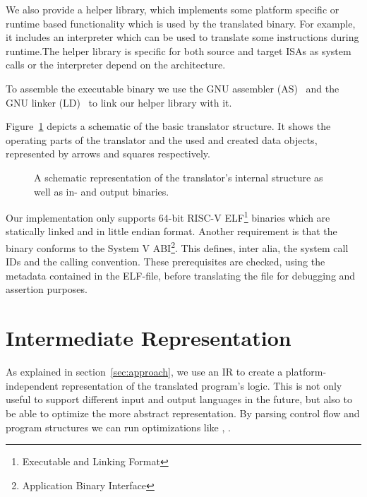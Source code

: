 \documentclass[course=eragp]{aspdoc}
\begin{document}
We also provide a helper library, which implements some platform specific or runtime based
functionality which is used by the translated binary. For example, it includes an interpreter which
can be used to translate some instructions during runtime.The helper library is specific for both
source and target ISAs as system calls or the interpreter depend on the architecture.

\par

To assemble the executable binary we use the GNU assembler (AS)~\cite{gnu_binutils} and the GNU
linker (LD)~\cite{gnu_binutils} to link our helper library with it.

\par

Figure~\ref{fig:program_overview} depicts a schematic of the basic translator structure. It shows the
operating parts of the translator and the used and created data objects, represented by arrows and
squares respectively.

\begin{figure}[H]
    \centering
    \caption{A schematic representation of the translator's internal structure as well as in- and
        output binaries.}\label{fig:program_overview}
\end{figure}

\par

Our implementation only supports 64-bit RISC-V ELF\footnote{Executable and Linking Format} binaries
which are statically linked and in little endian format. Another requirement is that the binary
conforms to the System V ABI\footnote{Application Binary Interface}. This defines, inter alia, the
system call IDs and the calling convention. These prerequisites are checked, using the metadata
contained in the ELF-file, before translating the file for debugging and assertion purposes.

\section{Intermediate Representation}\label{sec:ir}

As explained in section~\ref{sec:approach}, we use an IR to create a platform-independent
representation of the translated program's logic. This is not only useful to support different input
and output languages in the future, but also to be able to optimize the more abstract representation.
By parsing control flow and program structures we can run optimizations like
, .
\end{document}
